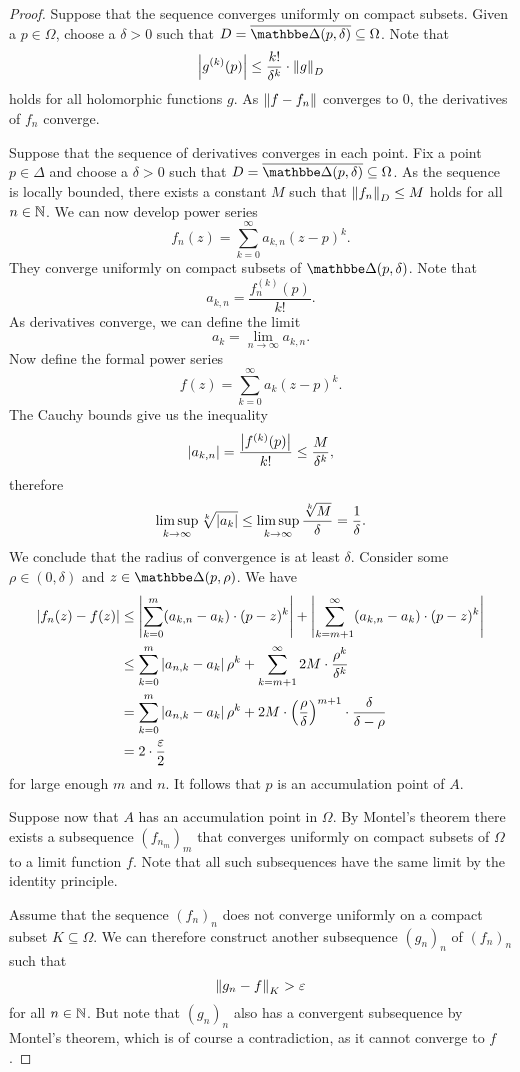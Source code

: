 \begin{proof}
Suppose that the sequence converges uniformly on compact subsets.
Given a $p \in \Omega$, choose a $\delta > 0$ such that
$D = \oline{\dsk(p, \delta)} \subseteq \Omega$. Note that
\[
\left\lvert g^{(k)}(p)\right\rvert \leq \frac{k!}{\delta^k} \cdot \left\lVert g\right\rVert_D
\]
holds for all holomorphic functions $g$. As
$\left\lVert f - f_n\right\rVert$ converges to $0$, the derivatives of $f_n$
converge.

Suppose that the sequence of derivatives converges in each point.
Fix a point $p \in \Delta$ and choose a $\delta > 0$ such that
$D = \oline{\dsk(p, \delta)} \subseteq \Omega$. As the sequence is
locally bounded, there exists a constant $M$ such that
$\left\lVert f_n\right\rVert_D \leq M$ holds for all $n \in \mathbb{N}$. We can now develop
power series
\[
f_n(z) = \sum_{k=0}^\infty a_{k,n} (z-p)^k.
\]
They converge uniformly on compact subsets of $\dsk(p, \delta)$.
Note that
\[
a_{k,n} = \frac{f_n^{(k)}(p)}{k!}.
\]
As derivatives converge, we can define the limit
\[
a_k = \lim_{n \to \infty} a_{k,n}.
\]
Now define the formal power series
\[
f(z) = \sum_{k=0}^\infty a_k (z-p)^k.
\]
The Cauchy bounds give us the inequality
\[
\left\lvert a_{k,n}\right\rvert =
\frac{\left\lvert f^{(k)}(p)\right\rvert}{k!} \leq \frac{M}{\delta^k},
\]
therefore
\[
\limsup_{k \to \infty} \sqrt[k]{\left\lvert a_k\right\rvert} \leq
\limsup_{k \to \infty} \frac{\sqrt[k]{M}}{\delta} =
\frac{1}{\delta}.
\]
We conclude that the radius of convergence is at least $\delta$.
Consider some $\rho \in (0, \delta)$ and
$z \in \dsk(p, \rho)$. We have
\begin{align*}
\left\lvert f_n(z) - f(z)\right\rvert &\leq
\left\lvert \sum_{k=0}^m (a_{k,n} - a_k) \cdot (p-z)^k\right\rvert +
\left\lvert \sum_{k=m+1}^\infty (a_{k,n} - a_k) \cdot (p-z)^k\right\rvert
\\
&\leq
\sum_{k=0}^m \left\lvert a_{n,k} - a_k\right\rvert \rho^k +
\sum_{k=m+1}^\infty 2M \cdot \frac{\rho^k}{\delta^k}
\\
&=
\sum_{k=0}^m \left\lvert a_{n,k} - a_k\right\rvert \rho^k +
2M \cdot \left(\frac{\rho}{\delta}\right)^{m+1} \cdot
\frac{\delta}{\delta - \rho}
\\
&=
2 \cdot \frac{\varepsilon}{2}
\end{align*}
for large enough $m$ and $n$. It follows that $p$ is an
accumulation point of $A$.

Suppose now that $A$ has an accumulation point in $\Omega$. By
Montel's theorem there exists a subsequence $(f_{n_m})_m$ that
converges uniformly on compact subsets of $\Omega$ to a limit
function $f$. Note that all such subsequences have the same limit
by the identity principle.

Assume that the sequence $(f_n)_n$ does not converge uniformly on
a compact subset $K \subseteq \Omega$. We can therefore construct
another subsequence $(g_n)_n$ of $(f_n)_n$ such that
\[
\left\lVert g_n - f\right\rVert_K > \varepsilon
\]
for all $n \in \mathbb{N}$. But note that $(g_n)_n$ also has a convergent
subsequence by Montel's theorem, which is of course a
contradiction, as it cannot converge to $f$.
\end{proof}
